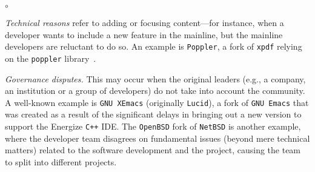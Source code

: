 
\begin{list}{$\circ$}{}
   \item \textit{Technical reasons} refer to adding or focusing content---for instance, when a developer wants to include a new feature in the mainline, but the mainline developers are reluctant to do so. An example is \texttt{Poppler}, a fork of \texttt{xpdf} relying on the \texttt{poppler} library~\cite{Gregorio:2012}.

    \item \textit{Governance disputes.} This may occur when the original leaders (e.g., a company, an institution or a group of developers) do not take into account the community. A well-known example is \texttt{GNU XEmacs} (originally \texttt{Lucid}), a fork of \texttt{GNU Emacs} that was created as a result of the significant delays in bringing out a new version to support the Energize \texttt{C++} IDE. The \texttt{OpenBSD} fork of \texttt{NetBSD} is another example, where the developer team disagrees on fundamental issues (beyond mere technical matters) related to the software development and the project, causing the team to split into different projects. %





\end{list}
